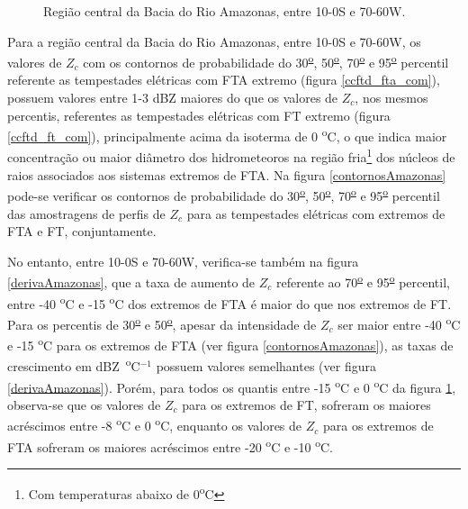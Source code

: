 \begin{figure}[!ht]
  \centering
  \caption{Região central da Bacia do Rio Amazonas, entre 10-0S e 70-60W.}
  \label{deriv_amazonas}  
\end{figure} 

Para a região central da Bacia do Rio Amazonas, entre 10-0S e 70-60W, os valores de $Z_c$ com os contornos de probabilidade do 30\textsuperscript{\underline{o}}, 50\textsuperscript{\underline{o}}, 70\textsuperscript{\underline{o}} e 95\textsuperscript{\underline{o}} percentil referente as tempestades elétricas com FTA extremo (figura \ref{ccftd_fta_com}), possuem valores entre 1-3 dBZ maiores do que os valores de $Z_c$, nos mesmos percentis, referentes as tempestades elétricas com FT extremo (figura \ref{ccftd_ft_com}), principalmente acima da isoterma de 0 \textsuperscript{o}C, o que indica maior concentração ou maior diâmetro dos hidrometeoros na região fria\footnote{Com temperaturas abaixo de  0\textsuperscript{o}C} dos núcleos de raios associados aos sistemas extremos de FTA. Na figura \ref{contornosAmazonas} pode-se verificar os contornos de probabilidade do 30\textsuperscript{\underline{o}}, 50\textsuperscript{\underline{o}}, 70\textsuperscript{\underline{o}} e 95\textsuperscript{\underline{o}} percentil das amostragens de perfis de $Z_c$  para as tempestades elétricas com extremos de FTA e FT, conjuntamente.

No entanto, entre 10-0S e 70-60W, verifica-se também na figura \ref{derivaAmazonas}, que a taxa de aumento de $Z_c$ referente ao 70\textsuperscript{\underline{o}} e 95\textsuperscript{\underline{o}} percentil, entre -40 \textsuperscript{o}C e -15 \textsuperscript{o}C dos extremos de FTA é maior do que nos extremos de FT. Para os percentis de 30\textsuperscript{\underline{o}} e 50\textsuperscript{\underline{o}}, apesar da intensidade de $Z_c$ ser maior entre -40 \textsuperscript{o}C e -15 \textsuperscript{o}C para os extremos de FTA (ver figura \ref{contornosAmazonas}), as taxas de crescimento em dBZ~\textsuperscript{o}C$^{-1}$ possuem valores semelhantes (ver figura \ref{derivaAmazonas}). Porém, para todos os quantis entre -15 \textsuperscript{o}C e 0 \textsuperscript{o}C da figura \ref{deriv_amazonas}, observa-se que os valores de $Z_c$ para os extremos de FT, sofreram os maiores acréscimos entre -8 \textsuperscript{o}C e 0 \textsuperscript{o}C, enquanto os valores de $Z_c$ para os extremos de FTA sofreram os maiores acréscimos entre -20 \textsuperscript{o}C e -10 \textsuperscript{o}C. %

